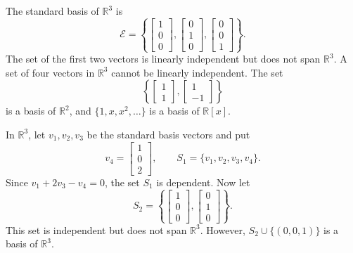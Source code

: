 \begin{Example}
The standard basis of $\mathbb R^3$ is
\begin{equation*}
\mathcal E=\left\{\begin{bmatrix}1\\0\\0\end{bmatrix},
\begin{bmatrix}0\\1\\0\end{bmatrix},
\begin{bmatrix}0\\0\\1\end{bmatrix}\right\}.
\end{equation*}
The set of the first two vectors is linearly independent but does not span $\mathbb R^3$. A set of four vectors in $\mathbb R^3$ cannot be linearly independent. The set
\begin{equation*}
\left\{\begin{bmatrix}1\\1\end{bmatrix},
\begin{bmatrix}1\\-1\end{bmatrix}\right\}
\end{equation*}
is a basis of $\mathbb R^2$, and $\{1,x,x^2,\ldots\}$ is a basis of $\mathbb R[x]$.
\end{Example}

\begin{Example}
In $\mathbb R^3$, let $v_1,v_2,v_3$ be the standard basis vectors and put
\begin{equation*}
v_4=\begin{bmatrix}1\\0\\2\end{bmatrix},\qquad
S_1=\{v_1,v_2,v_3,v_4\}.
\end{equation*}
Since $v_1+2v_3-v_4=0$, the set $S_1$ is dependent. Now let
\begin{equation*}
S_2=\left\{\begin{bmatrix}1\\0\\0\end{bmatrix},
\begin{bmatrix}0\\1\\0\end{bmatrix}\right\}.
\end{equation*}
This set is independent but does not span $\mathbb R^3$. However, $S_2\cup\{(0,0,1)\}$ is a basis of $\mathbb R^3$.
\end{Example}

